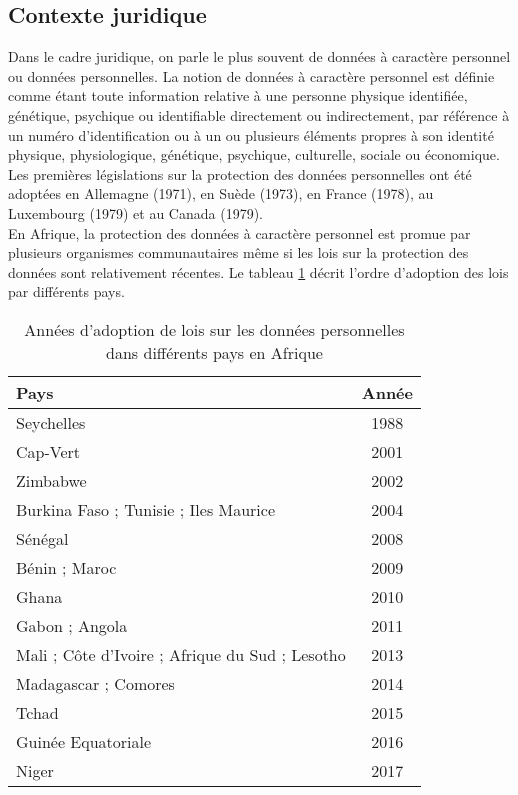 \subsection{Contexte juridique}
Dans le cadre juridique, on parle le plus souvent de données à caractère personnel ou données personnelles. La notion de données à caractère personnel est définie comme étant toute information relative à une personne physique identifiée, génétique, psychique ou identifiable directement ou indirectement, par référence à un numéro d’identification ou à un ou plusieurs éléments propres à son identité physique, physiologique, génétique, psychique, culturelle, sociale ou économique.
Les premières législations sur la protection des données personnelles ont été adoptées en Allemagne (1971), en Suède (1973), en France (1978), au Luxembourg (1979) et au Canada (1979).\\
En Afrique, la protection des données à caractère personnel est promue par plusieurs organismes communautaires même si les lois sur la protection des données sont relativement récentes. Le tableau \ref{table:5.1} décrit l’ordre d’adoption des lois par différents pays. \cite{pdp}\\
\begin{table}[hbt!]
	\centering
	\begin{tabular}{| l | c |} 
		\hline
		Pays & Année \\ [0.5ex] 
		\hline
		Seychelles & 1988 \\ 
		\hline
		Cap-Vert & 2001 \\
		\hline
		Zimbabwe & 2002 \\
		\hline
		Burkina Faso ; Tunisie ; Iles Maurice & 2004 \\
		\hline
		Sénégal & 2008 \\
		\hline
		Bénin ; Maroc & 2009 \\
		\hline
		Ghana & 2010 \\
		\hline
		Gabon ; Angola & 2011 \\
		\hline
		Mali ; Côte d’Ivoire ; Afrique du Sud ; Lesotho & 2013 \\
		\hline
		Madagascar ; Comores & 2014 \\
		\hline
		Tchad & 2015 \\
		\hline
		Guinée Equatoriale & 2016 \\
		\hline
		Niger & 2017 \\ [1ex] 
		\hline
	\end{tabular}
	\caption{Années d'adoption de lois sur les données personnelles dans différents pays en Afrique}
	\label{table:5.1}
\end{table}
